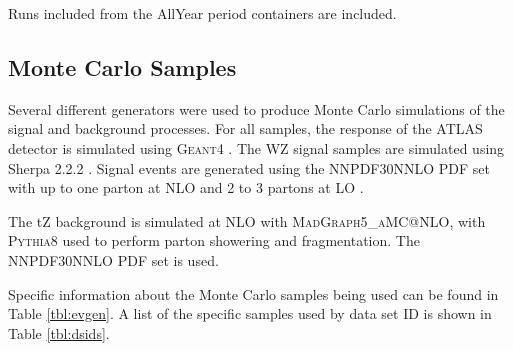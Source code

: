 Runs included from the AllYear period containers are included.

\subsection{Monte Carlo Samples}

Several different generators were used to produce Monte Carlo simulations of the signal and background processes. For all samples, the response of the ATLAS detector is simulated using \textsc{Geant4} \cite{GEANT4}. The WZ signal samples are simulated using Sherpa 2.2.2 \cite{sherpa}. Signal events are generated using the NNPDF30NNLO PDF set with up to one parton at NLO and 2 to 3 partons at LO \cite{Ball:2014uwa}. 

The tZ background is simulated at NLO with \textsc{MadGraph5\_aMC@NLO}, with \textsc{Pythia8} used to perform parton showering and fragmentation. The NNPDF30NNLO PDF set is used.

Specific information about the Monte Carlo samples being used can be found in Table \ref{tbl:evgen}. A list of the specific samples used by data set ID is shown in Table \ref{tbl:dsids}.

